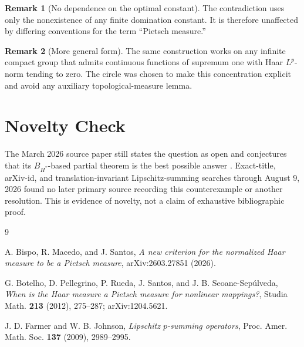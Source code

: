 \documentclass[11pt]{article}
\theoremstyle{definition}
\newtheorem{remark}{Remark}
\begin{document}
\begin{remark}[No dependence on the optimal constant]
The contradiction uses only the nonexistence of any finite domination
constant.  It is therefore unaffected by differing conventions for the term
``Pietsch measure.''
\end{remark}

\begin{remark}[More general form]
The same construction works on any infinite compact group that admits
continuous functions of supremum one with Haar \(L^p\)-norm tending to zero.
The circle was chosen to make this concentration explicit and avoid any
auxiliary topological-measure lemma.
\end{remark}

\section{Novelty Check}

The March 2026 source paper still states the question as open and conjectures
that its \(B_{H^*}\)-based partial theorem is the best possible answer
\cite[Remark following Theorem 4.3]{BMS}.  Exact-title, arXiv-id, and
translation-invariant Lipschitz-summing searches through August 9, 2026 found
no later primary source recording this counterexample or another resolution.
This is evidence of novelty, not a claim of exhaustive bibliographic proof.

\begin{thebibliography}{9}

A. Bispo, R. Macedo, and J. Santos,
\emph{A new criterion for the normalized Haar measure to be a Pietsch
measure}, arXiv:2603.27851 (2026).

G. Botelho, D. Pellegrino, P. Rueda, J. Santos, and
J. B. Seoane-Sep\'ulveda,
\emph{When is the Haar measure a Pietsch measure for nonlinear mappings?},
Studia Math. \textbf{213} (2012), 275--287; arXiv:1204.5621.

J. D. Farmer and W. B. Johnson,
\emph{Lipschitz \(p\)-summing operators},
Proc. Amer. Math. Soc. \textbf{137} (2009), 2989--2995.

\end{thebibliography}
\end{document}
